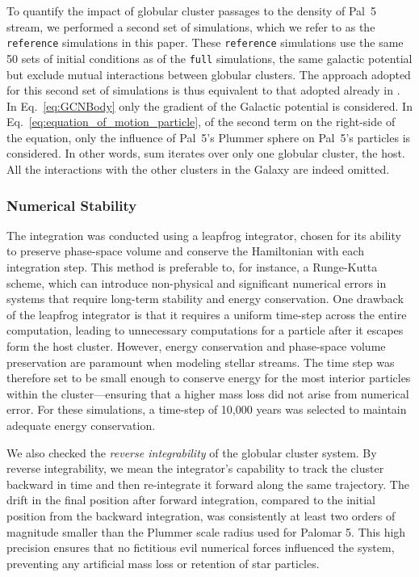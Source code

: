 \documentclass{aa}
\begin{document}
    To quantify the impact of globular cluster passages to the density of Pal~5 stream, we performed a second set of simulations, which we refer to as the \texttt{reference} simulations in this paper.  These \texttt{reference} simulations use the same 50 sets of initial conditions as of the \texttt{full} simulations, the same galactic potential but exclude mutual interactions between globular clusters. The approach adopted for this second set of simulations is thus equivalent to that adopted already in \citet{2023A&A...673A..44F}. In Eq.~\ref{eq:GCNBody} only the gradient of the Galactic potential  is considered. In Eq.~\ref{eq:equation_of_motion_particle}, of the second term on the right-side of the equation, only the influence of Pal~5's Plummer sphere on Pal~5's particles is considered. In other words, sum iterates over only one globular cluster, the host. All the interactions with the other clusters in the Galaxy are indeed omitted.


  \subsubsection*{Numerical Stability}

    The integration was conducted using a leapfrog integrator, chosen for its ability to preserve phase-space volume and conserve the Hamiltonian with each integration step. This method is preferable to, for instance, a Runge-Kutta scheme, which can introduce non-physical and significant numerical errors in systems that require long-term stability and energy conservation. One drawback of the leapfrog integrator is that it requires a uniform time-step across the entire computation, leading to unnecessary computations for a particle after it escapes form the host cluster. However, energy conservation and phase-space volume preservation are paramount when modeling stellar streams. The time step was therefore set to be small enough to conserve energy for the most interior particles within the cluster---ensuring that a higher mass loss did not arise from numerical error. For these simulations, a time-step of 10,000 years was selected to maintain adequate energy conservation. 
    
    We also checked the \textit{reverse integrability} of the globular cluster system. By reverse integrability, we mean the integrator's capability to track the cluster backward in time and then re-integrate it forward along the same trajectory. The drift in the final position after forward integration, compared to the initial position from the backward integration, was consistently at least two orders of magnitude smaller than the Plummer scale radius used for Palomar 5. This high precision ensures that no fictitious evil numerical forces influenced the system, preventing any artificial mass loss or retention of star particles.
\end{document}

